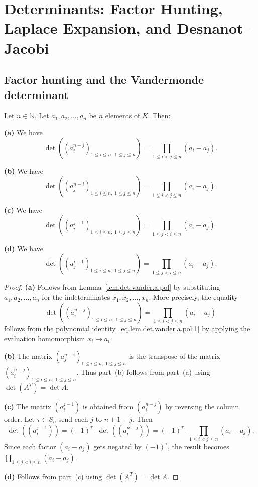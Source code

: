 \section{Determinants: Factor Hunting, Laplace Expansion, and Desnanot--Jacobi}

\subsection{Factor hunting and the Vandermonde determinant}

\begin{theorem}
\label{thm.det.vander}
\leantarget
\leanok
Let $n \in \mathbb{N}$. Let $a_1, a_2, \ldots, a_n$ be $n$ elements of $K$. Then:

\textbf{(a)} We have
\[
  \det\left( \left( a_i^{n-j} \right)_{1 \leq i \leq n,\; 1 \leq j \leq n} \right)
  = \prod_{1 \leq i < j \leq n} (a_i - a_j).
\]

\textbf{(b)} We have
\[
  \det\left( \left( a_j^{n-i} \right)_{1 \leq i \leq n,\; 1 \leq j \leq n} \right)
  = \prod_{1 \leq i < j \leq n} (a_i - a_j).
\]

\textbf{(c)} We have
\[
  \det\left( \left( a_i^{j-1} \right)_{1 \leq i \leq n,\; 1 \leq j \leq n} \right)
  = \prod_{1 \leq j < i \leq n} (a_i - a_j).
\]

\textbf{(d)} We have
\[
  \det\left( \left( a_j^{i-1} \right)_{1 \leq i \leq n,\; 1 \leq j \leq n} \right)
  = \prod_{1 \leq j < i \leq n} (a_i - a_j).
\]
\end{theorem}

\begin{proof}
\textbf{(a)} Follows from Lemma~\ref{lem.det.vander.a.pol} by substituting
$a_1, a_2, \ldots, a_n$ for the indeterminates $x_1, x_2, \ldots, x_n$.
More precisely, the equality
\[
  \det\left( \left( a_i^{n-j} \right)_{1 \leq i \leq n,\; 1 \leq j \leq n} \right)
  = \prod_{1 \leq i < j \leq n} (a_i - a_j)
\]
follows from the polynomial identity~\eqref{eq.lem.det.vander.a.pol.1} by
applying the evaluation homomorphism $x_i \mapsto a_i$.

\textbf{(b)} The matrix $\left( a_j^{n-i} \right)_{1 \leq i \leq n,\; 1 \leq j \leq n}$
is the transpose of the matrix $\left( a_i^{n-j} \right)_{1 \leq i \leq n,\; 1 \leq j \leq n}$.
Thus part~(b) follows from part~(a) using $\det(A^T) = \det A$.

\textbf{(c)} The matrix $\left( a_i^{j-1} \right)$ is obtained from
$\left( a_i^{n-j} \right)$ by reversing the column order.
Let $\tau \in S_n$ send each $j$ to $n+1-j$. Then
\[
  \det\left( \left( a_i^{j-1} \right) \right)
  = (-1)^\tau \cdot \det\left( \left( a_i^{n-j} \right) \right)
  = (-1)^\tau \cdot \prod_{1 \leq i < j \leq n} (a_i - a_j).
\]
Since each factor $(a_i - a_j)$ gets negated by $(-1)^\tau$, the result
becomes $\prod_{1 \leq j < i \leq n} (a_i - a_j)$.

\textbf{(d)} Follows from part~(c) using $\det(A^T) = \det A$.
\end{proof}

